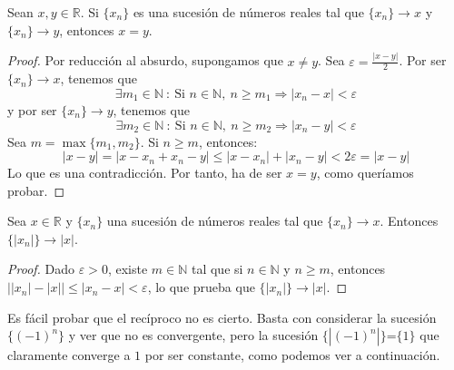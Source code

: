 \begin{prop}
    Sean $x,y \in \mathbb{R}$. Si $\{x_n\}$ es una sucesión de números reales tal que $\{x_n\}\longrightarrow x$ y $\{x_n\}\longrightarrow y$, entonces $x=y$.
\end{prop}
\begin{proof}
    Por reducción al absurdo, supongamos que $x \neq y$. Sea $\varepsilon = \frac{\left| x-y \right|}{2}$.
    Por ser $\{x_n\} \longrightarrow x$, tenemos que
    \begin{equation*}
        \exists m_1 \in \mathbb{N} ~:~ \text{Si $n \in \mathbb{N}$},~n \geq m_1 \Longrightarrow \left| x_n - x \right| < \varepsilon
    \end{equation*}
    y por ser $\{x_n\} \longrightarrow y$, tenemos que
    \begin{equation*}
        \exists m_2 \in \mathbb{N} ~:~ \text{Si $n \in \mathbb{N}$},~n \geq m_2 \Longrightarrow \left| x_n - y \right| < \varepsilon
    \end{equation*}
    Sea $m=\max \{m_1,m_2\}$. Si $n \geq m$, entonces:
    \begin{equation*}
        \left| x-y \right| = \left| x-x_n+x_n-y \right| \leq \left| x-x_n \right| + \left|x_n-y \right| < 2 \varepsilon = \left| x-y \right|
    \end{equation*}
    Lo que es una contradicción. Por tanto, ha de ser $x=y$, como queríamos probar.
\end{proof}

\begin{prop}
    Sea $x \in \mathbb{R}$ y $\{x_n\}$ una sucesión de números reales tal que $\{x_n\}\longrightarrow x$.
    Entonces $\{ \left| x_n \right| \} \longrightarrow \left| x \right|$.
\end{prop}
\begin{proof}
    Dado $\varepsilon > 0$, existe $m \in \mathbb{N}$ tal que si $n \in \mathbb{N}$ y $n \geq m$, entonces
    $\left| |x_n|-|x| \right| \leq \left| x_n-x \right| < \varepsilon$, lo que prueba que
    $\{ \left| x_n \right| \} \longrightarrow \left| x \right|$.
\end{proof}

Es fácil probar que el recíproco no es cierto. Basta con considerar la sucesión $\{(-1)^n\}$ y ver que no es convergente, pero la sucesión $\{|(-1)^n|\}$=$\{1\}$ que claramente converge a $1$ por ser constante, como podemos ver a continuación.

